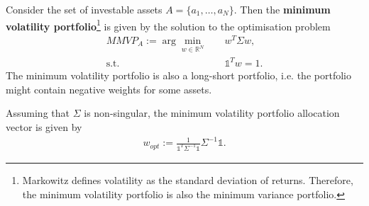     \begin{definition}\label{definition:MinimumVolatilityPortfolio}
        Consider the set of investable assets $A = \{ a_1, \dots, a_N \}$. Then the \textbf{minimum volatility portfolio}\footnote{Markowitz defines volatility as the standard deviation of returns. Therefore, the minimum volatility portfolio is also the minimum variance portfolio.} is given by the solution to the optimisation problem
        \begin{align*}
            MMVP_A := \arg \min_{w \in \mathbb{R}^N}& \quad w^T \Sigma w, \\
            \text{s.t.}& \quad \mathds{1}^T w = 1.
        \end{align*}
    	The minimum volatility portfolio is also a long-short portfolio, i.e. the portfolio might contain negative weights for some assets.
    \end{definition}
    
    
    \begin{theorem}
        Assuming that $\Sigma$ is non-singular, the minimum volatility portfolio allocation vector is given by
        \begin{align*}
            w_{opt} := \frac{1}{\mathds{1}^T \Sigma^{-1} \mathds{1}} \Sigma^{-1} \mathds{1}.
        \end{align*}
    \end{theorem}
    
